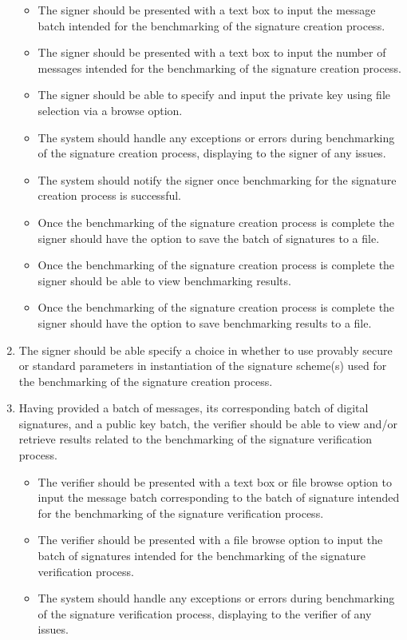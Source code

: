 \documentclass[]{final_report}
\theoremstyle{definition}
\begin{document}
\begin{enumerate}
\begin{itemize}
\item The signer should be presented with a text box to input the message batch intended for the benchmarking of the signature creation process.
\item The signer should be presented with a text box to input the number of messages intended for the benchmarking of the signature creation process.
\item The signer should be able to specify and input the private key using file selection via a browse option.
\item The system should handle any exceptions or errors during benchmarking of the signature creation process, displaying to the signer of any issues.
\item The system should notify the signer once benchmarking for the signature creation process is successful.
\item Once the benchmarking of the signature creation process is complete the signer should have the option to save the batch of signatures to a file.
\item Once the benchmarking of the signature creation process is complete the signer should be able to view benchmarking results.
\item Once the benchmarking of the signature creation process is complete the signer should have the option to save benchmarking results to a file.
\end{itemize}
\item The signer should be able specify a choice in whether to use provably secure or standard parameters in instantiation of the signature scheme(s) used for the benchmarking of the signature creation process.
\item Having provided a batch of messages, its corresponding batch of digital signatures, and a public key batch, the verifier should be able to view and/or retrieve results related to the benchmarking of the signature verification process.
\begin{itemize}
\item The verifier should be presented with a text box or file browse option to input the message batch corresponding to the batch of signature intended for the benchmarking of the signature verification process.
\item The verifier should be presented with a file browse option to input the batch of signatures intended for the benchmarking of the signature verification process.
\item The system should handle any exceptions or errors during benchmarking of the signature verification process, displaying to the verifier of any issues.

\end{itemize}
\end{enumerate}
\end{document}
